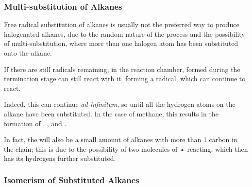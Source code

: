

	\subsubsection{Multi-substitution of Alkanes}

		Free radical substitution of alkanes is usually not the preferred way to produce
		halogenated alkanes, due to the random nature of the process and the possibility of multi-substitution,
		where more than one halogen atom has been substituted onto the alkane.

		If there are still \ch{\chlorine} radicals remaining, in the reaction chamber,  formed during the
		termination stage can still react with it, forming a  radical, which can continue to react.


		\vspace{-15mm}

		Indeed, this can continue \textit{ad-infinitum}, so until all the hydrogen atoms on the alkane have been substituted.
		In the case of methane, this results in the formation of , ,  and
		.

		In fact, the will also be a small amount of alkanes with more than 1 carbon in the chain; this is due to the
		possibility of two molecules of • reacting, which then has its hydrogens further substituted.





	\pagebreak
	\subsubsection{Isomerism of Substituted Alkanes}

